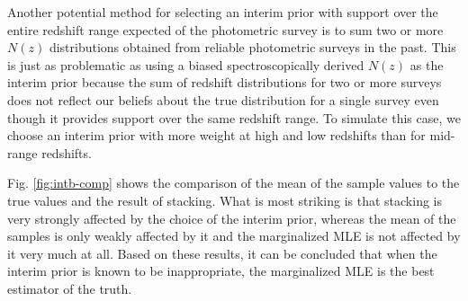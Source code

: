 \documentclass[preprint]{aastex}
\begin{document}
Another potential method for selecting an interim prior with support over the 
entire redshift range expected of the photometric survey is to sum two or more 
$N(z)$ distributions obtained from reliable photometric surveys in the past.  
This is just as problematic as using a biased spectroscopically derived $N(z)$ 
as the interim prior because the sum of redshift distributions for two or more 
surveys does not reflect our beliefs about the true distribution for a single 
survey even though it provides support over the same redshift range.  To 
simulate this case, we choose an interim prior with more weight at high and low 
redshifts than for mid-range redshifts.  

Fig. \ref{fig:intb-comp} shows the comparison of the mean of the sample values 
to the true values and the result of stacking.  What is most striking is that 
stacking is very strongly affected by the choice of the interim prior, whereas 
the mean of the samples is only weakly affected by it and the marginalized MLE 
is not affected by it very much at all.  Based on these results, it can be 
concluded that when the interim prior is known to be inappropriate, the 
marginalized MLE is the best estimator of the truth.  

\end{document}
